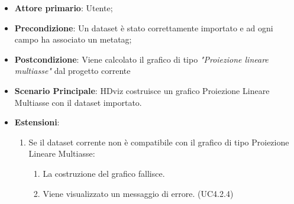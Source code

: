 \begin{itemize}

    \item \textbf{Attore primario}: Utente;

    \item \textbf{Precondizione}:   Un dataset è stato correttamente importato e ad ogni campo ha associato
                                    un metatag;

    \item \textbf{Postcondizione}:  Viene calcolato il grafico di tipo \emph{"Proiezione lineare multiasse"} dal progetto corrente

	\item \textbf{Scenario Principale}: HDviz costruisce un grafico Proiezione Lineare Multiasse con il dataset importato.
	\item \textbf{Estensioni}:
	\begin{enumerate}
		\item Se il dataset corrente non è compatibile con il grafico di tipo Proiezione Lineare Multiasse:
		\begin{enumerate}
			\item La costruzione del grafico fallisce.
			\item Viene visualizzato un messaggio di errore. (UC4.2.4)
		\end{enumerate}
	\end{enumerate}
\end{itemize}


